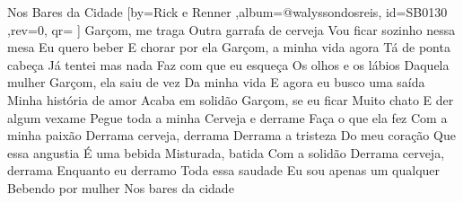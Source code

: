 \beginsong
{Nos Bares da Cidade %
}[by={Rick e Renner %
},album={@walyssondosreis},
id={SB0130 %
},rev={0}, %
qr={ %
}]
\beginverse
Garçom, me traga
Outra garrafa de cerveja
Vou ficar sozinho nessa mesa
Eu quero beber
E chorar por ela
\endverse
\beginverse
Garçom, a minha vida agora
Tá de ponta cabeça
Já tentei mas nada
Faz com que eu esqueça
Os olhos e os lábios
Daquela mulher
\endverse
\beginverse
Garçom, ela saiu de vez
Da minha vida
E agora eu busco uma saída
Minha história de amor
Acaba em solidão
\endverse
\beginverse
Garçom, se eu ficar
Muito chato
E der algum vexame
Pegue toda a minha
Cerveja e derrame
Faça o que ela fez
Com a minha paixão
\endverse
\beginchorus
Derrama cerveja, derrama
Derrama a tristeza
Do meu coração
Que essa angustia
É uma bebida
Misturada, batida
Com a solidão
Derrama cerveja, derrama
Enquanto eu derramo
Toda essa saudade
Eu sou apenas um qualquer
Bebendo por mulher
Nos bares da cidade
\endchorus
\vspace{4em} %
\begin{comment}
\lstset{basicstyle=\scriptsize\bf} %
\tab{Solo 1}
\begin{lstlisting}
E|-----------------------------------------------------|
B|-----------------------------------------------------|
G|-----------------------------------------------------|
D|-----------------------------------------------------|
A|-----------------------------------------------------|
E|-----------------------------------------------------|
\end{lstlisting}
\end{comment}
\color{drawChord}%
\color{drawChord}%
\color{drawChord}%
\color{drawChord}%

